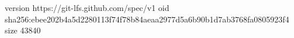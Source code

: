 version https://git-lfs.github.com/spec/v1
oid sha256:ebee202b4a5d2280113f74f78b84aeaa2977d5a6b90b1d7ab3768fa0805923f4
size 43840
